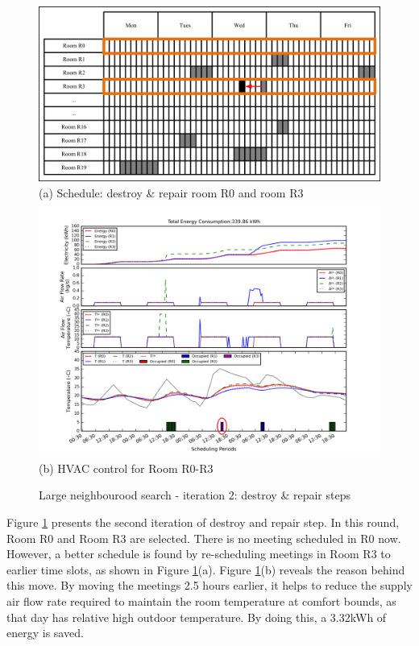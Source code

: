 \begin{figure}
	\centering
		\includegraphics[width=0.9\linewidth]{figs/lns_sche_ds2.jpg}\\
(a) Schedule: destroy \& repair room R0 and room R3  \\[6pt]
		\includegraphics[width=1\linewidth]{figs/lns_dr2.png} \\
(b) HVAC control for Room R0-R3  \\[6pt]
	\caption{Large neighbourood search - iteration 2: destroy \& repair steps}
	\label{fig:lns_dr2}
\end{figure}

Figure \ref{fig:lns_dr2} presents the second iteration of destroy and repair step. In this round, Room R0 and Room R3 are selected. There is no meeting scheduled in R0 now. However, a better schedule is found by re-scheduling meetings in Room R3 to earlier time slots, as shown in Figure \ref{fig:lns_dr2}(a). Figure \ref{fig:lns_dr2}(b) reveals the reason behind this move. By moving the meetings 2.5 hours earlier, it helps to reduce the supply air flow rate required to maintain the room temperature at comfort bounds, as that day has relative high outdoor temperature. By doing this, a 3.32kWh of energy is saved.


